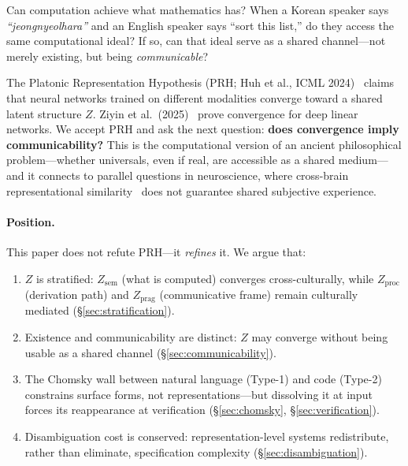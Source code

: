 \documentclass[11pt]{article}
\theoremstyle{definition}
\newcommand{\Zsem}{Z_{\text{sem}}}
\newcommand{\Zproc}{Z_{\text{proc}}}
\newcommand{\Zprag}{Z_{\text{prag}}}
\begin{document}
Can computation achieve what mathematics has? When a Korean speaker says \emph{``jeongnyeolhara''} and an English speaker says ``sort this list,'' do they access the same computational ideal? If so, can that ideal serve as a shared channel---not merely existing, but being \emph{communicable}?

The Platonic Representation Hypothesis (PRH; Huh et al., ICML 2024)~\cite{huh2024platonic} claims that neural networks trained on different modalities converge toward a shared latent structure $Z$. Ziyin et al.\ (2025)~\cite{ziyin2025proof} prove convergence for deep linear networks. We accept PRH and ask the next question: \textbf{does convergence imply communicability?} This is the computational version of an ancient philosophical problem---whether universals, even if real, are accessible as a shared medium---and it connects to parallel questions in neuroscience, where cross-brain representational similarity~\cite{haxby2011hyperalignment} does not guarantee shared subjective experience.

\paragraph{Position.} This paper does not refute PRH---it \emph{refines} it. We argue that:
\begin{enumerate}[label=(\roman*),nosep]
  \item $Z$ is stratified: $\Zsem$ (what is computed) converges cross-culturally, while $\Zproc$ (derivation path) and $\Zprag$ (communicative frame) remain culturally mediated (\S\ref{sec:stratification}).
  \item Existence and communicability are distinct: $Z$ may converge without being usable as a shared channel (\S\ref{sec:communicability}).
  \item The Chomsky wall between natural language (Type-1) and code (Type-2) constrains surface forms, not representations---but dissolving it at input forces its reappearance at verification (\S\ref{sec:chomsky}, \S\ref{sec:verification}).
  \item Disambiguation cost is conserved: representation-level systems redistribute, rather than eliminate, specification complexity (\S\ref{sec:disambiguation}).
\end{enumerate}
\end{document}
